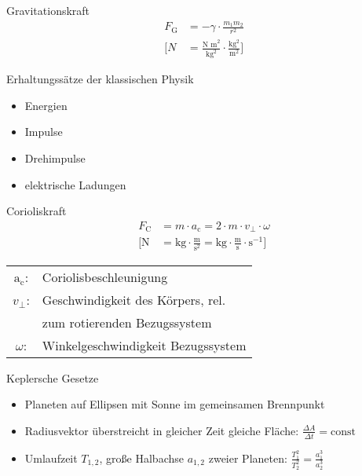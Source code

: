 \begin{karte}{Gravitationskraft}
    \begin{align*}
        F_\text{G} &= - \gamma \cdot \frac{m_1m_2}{r^2} \\
        \bigg[ N &= \frac{\text{N m}^2}{\text{kg}^2} \cdot \frac{\text{kg}^2}{\text{m}^2} \bigg]
    \end{align*}
\end{karte}

\begin{karte}{Erhaltungssätze der klassischen Physik}
    \begin{itemize}
        \item Energien
        \item Impulse
        \item Drehimpulse
        \item elektrische Ladungen
    \end{itemize}
\end{karte}

\begin{karte}{Corioliskraft}
    \begin{align*}
        F_\text{C} &= m \cdot a_\text{c} = 2 \cdot m \cdot v_\bot \cdot \omega \\
        \bigg[ \text{N} &= \text{kg} \cdot \frac{\text{m}}{\text{s}^2} = \text{kg} \cdot \frac{\text{m}}{\text{s}} \cdot \text{s}^{-1} \bigg]
    \end{align*}
    \begin{tabular}[t]{cl}
        \(\text{a}_\text{c}\): & Coriolisbeschleunigung \\
        \(v_\bot\): & Geschwindigkeit des Körpers, rel. \\
            & zum rotierenden Bezugssystem \\
        \(\omega\): & Winkelgeschwindigkeit Bezugssystem
    \end{tabular}
\end{karte}

\begin{karte}{Keplersche Gesetze}
    \begin{itemize}
        \item Planeten auf Ellipsen mit Sonne im gemeinsamen Brennpunkt
        \item Radiusvektor überstreicht in gleicher Zeit gleiche Fläche: \(\frac{\Delta A}{\Delta t} = \text{const}\)
        \item Umlaufzeit \(T_{1,2}\), große Halbachse \(a_{1,2}\) zweier Planeten: \( \frac{T_1^2}{T_2^2} = \frac{a_1^3}{a_2^3} \)
    \end{itemize}
\end{karte}

